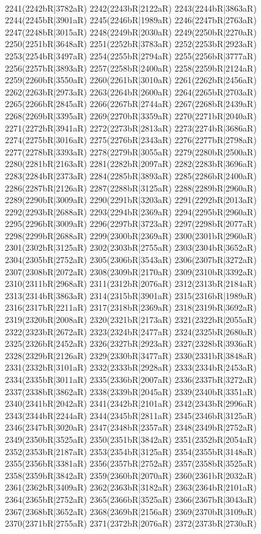 \\2241(2242bR|3782aR) 2242(2243bR|2122aR) 2243(2244bR|3863aR) 2244(2245bR|3901aR) 2245(2246bR|1989aR) 2246(2247bR|2763aR) 2247(2248bR|3015aR) 2248(2249bR|2030aR) 2249(2250bR|2270aR) \\2250(2251bR|3648aR) 2251(2252bR|3783aR) 2252(2253bR|2923aR) 2253(2254bR|3497aR) 2254(2255bR|2794aR) 2255(2256bR|3777aR) 2256(2257bR|3893aR) 2257(2258bR|2400aR) 2258(2259bR|2124aR) \\2259(2260bR|3550aR) 2260(2261bR|3010aR) 2261(2262bR|2456aR) 2262(2263bR|2973aR) 2263(2264bR|2600aR) 2264(2265bR|2703aR) 2265(2266bR|2845aR) 2266(2267bR|2744aR) 2267(2268bR|2439aR) \\2268(2269bR|3395aR) 2269(2270bR|3359aR) 2270(2271bR|2040aR) 2271(2272bR|3941aR) 2272(2273bR|2813aR) 2273(2274bR|3686aR) 2274(2275bR|3016aR) 2275(2276bR|2343aR) 2276(2277bR|2798aR) \\2277(2278bR|3393aR) 2278(2279bR|3055aR) 2279(2280bR|2500aR) 2280(2281bR|2163aR) 2281(2282bR|2097aR) 2282(2283bR|3696aR) 2283(2284bR|2373aR) 2284(2285bR|3893aR) 2285(2286bR|2400aR) \\2286(2287bR|2126aR) 2287(2288bR|3125aR) 2288(2289bR|2960aR) 2289(2290bR|3009aR) 2290(2291bR|3203aR) 2291(2292bR|2013aR) 2292(2293bR|2688aR) 2293(2294bR|2369aR) 2294(2295bR|2960aR) \\2295(2296bR|3009aR) 2296(2297bR|3723aR) 2297(2298bR|2077aR) 2298(2299bR|2688aR) 2299(2300bR|2369aR) 2300(2301bR|2960aR) 2301(2302bR|3125aR) 2302(2303bR|2755aR) 2303(2304bR|3652aR) \\2304(2305bR|2752aR) 2305(2306bR|3543aR) 2306(2307bR|3272aR) 2307(2308bR|2072aR) 2308(2309bR|2170aR) 2309(2310bR|3392aR) 2310(2311bR|2968aR) 2311(2312bR|2076aR) 2312(2313bR|2184aR) \\2313(2314bR|3863aR) 2314(2315bR|3901aR) 2315(2316bR|1989aR) 2316(2317bR|2211aR) 2317(2318bR|2369aR) 2318(2319bR|3692aR) 2319(2320bR|2008aR) 2320(2321bR|2173aR) 2321(2322bR|2055aR) \\2322(2323bR|2672aR) 2323(2324bR|2477aR) 2324(2325bR|2680aR) 2325(2326bR|2452aR) 2326(2327bR|2923aR) 2327(2328bR|3936aR) 2328(2329bR|2126aR) 2329(2330bR|3477aR) 2330(2331bR|3848aR) \\2331(2332bR|3101aR) 2332(2333bR|2928aR) 2333(2334bR|2453aR) 2334(2335bR|3011aR) 2335(2336bR|2007aR) 2336(2337bR|3272aR) 2337(2338bR|3862aR) 2338(2339bR|2045aR) 2339(2340bR|3351aR) \\2340(2341bR|2042aR) 2341(2342bR|2101aR) 2342(2343bR|2996aR) 2343(2344bR|2244aR) 2344(2345bR|2811aR) 2345(2346bR|3125aR) 2346(2347bR|3020aR) 2347(2348bR|2357aR) 2348(2349bR|2752aR) \\2349(2350bR|3525aR) 2350(2351bR|3842aR) 2351(2352bR|2054aR) 2352(2353bR|2187aR) 2353(2354bR|3125aR) 2354(2355bR|3148aR) 2355(2356bR|3381aR) 2356(2357bR|2752aR) 2357(2358bR|3525aR) \\2358(2359bR|3842aR) 2359(2360bR|2070aR) 2360(2361bR|2032aR) 2361(2362bR|3409aR) 2362(2363bR|3182aR) 2363(2364bR|2101aR) 2364(2365bR|2752aR) 2365(2366bR|3525aR) 2366(2367bR|3043aR) \\2367(2368bR|3652aR) 2368(2369bR|2156aR) 2369(2370bR|3109aR) 2370(2371bR|2755aR) 2371(2372bR|2076aR) 2372(2373bR|2730aR) 